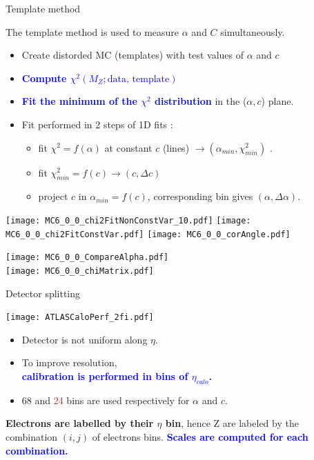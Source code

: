 \begin{frame}{Template method}
\begin{minipage}{0.59\linewidth}
  The template method is used to measure $\alpha$ and $C$ simultaneously.
\begin{itemize}
\item Create distorded MC (templates) with test values of $\alpha$ and $c$
\item \textcolor{blue}{\bf Compute $\chi^2( M_Z; \text{data, template})$}
\item \textcolor{blue}{\bf Fit the minimum of the $\chi^2$ distribution} in the ($\alpha,c$) plane.
\item Fit performed in 2 steps of 1D fits : 
\begin{itemize}
\item fit $\chi^2=f(\alpha)$ at constant $c$ (lines) $\rightarrow (\alpha_{min}, \chi^2_{min})$ .
\item fit $\chi^2_{min}=f(c)\rightarrow (c, \Delta c)$
\item project $c$ in $\alpha_{min}=f(c)$, corresponding bin gives $(\alpha, \Delta\alpha)$.
\end{itemize}
\end{itemize}
  \texttt{[image: MC6\_0\_0\_chi2FitNonConstVar\_10.pdf]}
  \texttt{[image: MC6\_0\_0\_chi2FitConstVar.pdf]}
  \texttt{[image: MC6\_0\_0\_corAngle.pdf]}
\end{minipage}
\hfill
\begin{minipage}{0.4\linewidth}
  \texttt{[image: MC6\_0\_0\_CompareAlpha.pdf]}\\
  \texttt{[image: MC6\_0\_0\_chiMatrix.pdf]}\\
\end{minipage}
\end{frame}

\begin{frame}{Detector splitting}
  \begin{minipage}{0.49\linewidth}
    \texttt{[image: ATLASCaloPerf\_2fi.pdf]}
  \end{minipage}
  \begin{minipage}{0.49\linewidth}
    \begin{itemize}
    \item Detector is not uniform along $\eta$.
    \item To improve resolution, \\ \textcolor{blue}{\bf calibration is performed in bins of $\eta_{calo}$.}
    \item 68 and \textcolor{brown}{24} bins are used respectively for $\alpha$ and $c$.\\
    \end{itemize}
  \end{minipage}
  \vfill
  {\bf Electrons are labelled by their $\eta$ bin}, hence Z are labeled by the combination $(i, j)$ of electrons bins.
  \textcolor{blue}{\bf Scales are computed for each combination.}
\end{frame}

